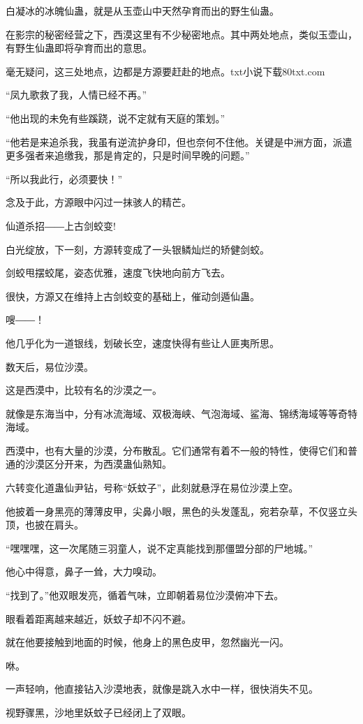 \begin{this_body}
白凝冰的冰魄仙蛊，就是从玉壶山中天然孕育而出的野生仙蛊。

在影宗的秘密经营之下，西漠这里有不少秘密地点。其中两处地点，类似玉壶山，有野生仙蛊即将孕育而出的意思。

毫无疑问，这三处地点，边都是方源要赶赴的地点。txt小说下载80txt.com

“凤九歌救了我，人情已经不再。”

“他出现的未免有些蹊跷，说不定就有天庭的策划。”

“他若是来追杀我，我虽有逆流护身印，但也奈何不住他。关键是中洲方面，派遣更多强者来追缴我，那是肯定的，只是时间早晚的问题。”

“所以我此行，必须要快！”

念及于此，方源眼中闪过一抹骇人的精芒。

仙道杀招――上古剑蛟变!

白光绽放，下一刻，方源转变成了一头银鳞灿烂的矫健剑蛟。

剑蛟甩摆蛟尾，姿态优雅，速度飞快地向前方飞去。

很快，方源又在维持上古剑蛟变的基础上，催动剑遁仙蛊。

嗖――！

他几乎化为一道银线，划破长空，速度快得有些让人匪夷所思。

数天后，易位沙漠。

这是西漠中，比较有名的沙漠之一。

就像是东海当中，分有冰流海域、双极海峡、气泡海域、鲨海、锦绣海域等等奇特海域。

西漠中，也有大量的沙漠，分布散乱。它们通常有着不一般的特性，使得它们和普通的沙漠区分开来，为西漠蛊仙熟知。

六转变化道蛊仙尹钻，号称“妖蚊子”，此刻就悬浮在易位沙漠上空。

他披着一身黑亮的薄薄皮甲，尖鼻小眼，黑色的头发蓬乱，宛若杂草，不仅竖立头顶，也披在肩头。

“嘿嘿嘿，这一次尾随三羽童人，说不定真能找到那僵盟分部的尸地城。”

他心中得意，鼻子一耸，大力嗅动。

“找到了。”他双眼发亮，循着气味，立即朝着易位沙漠俯冲下去。

眼看着距离越来越近，妖蚊子却不闪不避。

就在他要接触到地面的时候，他身上的黑色皮甲，忽然幽光一闪。

咻。

一声轻响，他直接钻入沙漠地表，就像是跳入水中一样，很快消失不见。

视野骤黑，沙地里妖蚊子已经闭上了双眼。


\end{this_body}
